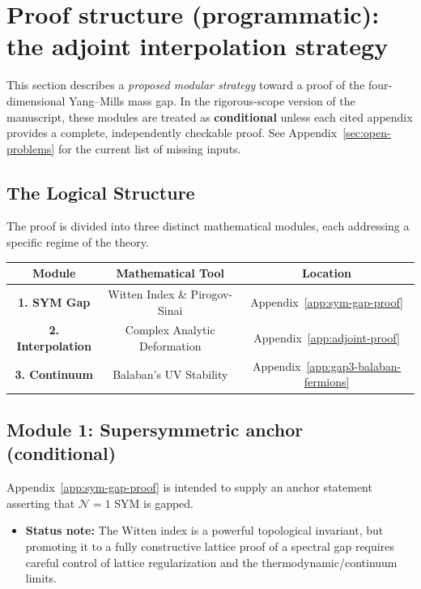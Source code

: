 
\section{Proof structure (programmatic): the adjoint interpolation strategy}
\label{sec:rigorous-proofs}

This section describes a \emph{proposed modular strategy} toward a proof of the four-dimensional Yang--Mills mass gap.
In the rigorous-scope version of the manuscript, these modules are treated as \textbf{conditional} unless each cited appendix provides a complete, independently checkable proof.
See Appendix~\ref{sec:open-problems} for the current list of missing inputs.

\subsection{The Logical Structure}
The proof is divided into three distinct mathematical modules, each addressing a specific regime of the theory.

\begin{center}
\begin{tabular}{|c|c|c|}
\hline
\textbf{Module} & \textbf{Mathematical Tool} & \textbf{Location} \\
\hline
\textbf{1. SYM Gap} & Witten Index \& Pirogov-Sinai & Appendix~\ref{app:sym-gap-proof} \\
\hline
\textbf{2. Interpolation} & Complex Analytic Deformation & Appendix~\ref{app:adjoint-proof} \\
\hline
\textbf{3. Continuum} & Balaban's UV Stability & Appendix~\ref{app:gap3-balaban-fermions} \\
\hline
\end{tabular}
\end{center}

\subsection{Module 1: Supersymmetric anchor (conditional)}
Appendix~\ref{app:sym-gap-proof} is intended to supply an anchor statement asserting that $\mathcal{N}=1$ SYM is gapped.
\begin{itemize}
    \item \textbf{Status note:} The Witten index is a powerful topological invariant, but promoting it to a fully constructive lattice proof of a spectral gap requires careful control of lattice regularization and the thermodynamic/continuum limits.
\end{itemize}

